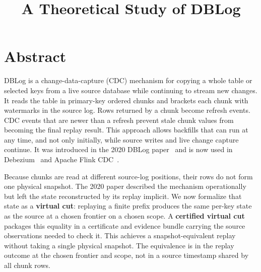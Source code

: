 \documentclass[letterpaper,10pt,twocolumn]{article}
\title{A Theoretical Study of DBLog}
\author{}
\date{}
\makeatletter
\newcommand{\papersubtitle}{Certified Virtual Cuts for a Snapshot-Equivalent Replay of Live Databases}
\newcommand{\paperauthor}{Andreas Andreakis}
\renewcommand{\maketitle}{%
  \twocolumn[{%
    \begin{center}
      {\LARGE\bfseries \@title\par}
      \vspace{0.35em}
      {\large \itshape \papersubtitle\par}
      \vspace{1.1em}
      {\large \paperauthor\par}
    \end{center}
    \vspace{1.5em}
  }]%
  \thispagestyle{plain}%
}
\makeatother
\begin{document}
\maketitle

%
%
\section*{Abstract}\label{abstract}

DBLog is a change-data-capture (CDC) mechanism for copying a whole table
or selected keys from a live source database while continuing to stream
new changes. It reads the table in primary-key ordered chunks and brackets
each chunk with watermarks in the source log. Rows returned by
a chunk become refresh events. CDC events that are newer than a refresh
prevent stale chunk values from becoming the final replay result. This
approach allows backfills that can run at any time, and not only
initially, while source writes and live change capture continue. It was
introduced in the 2020 DBLog
paper~\citep{andreakis2020dblog} and is now used in
Debezium~\citep{debezium_incremental_snapshot} and Apache Flink
CDC~\citep{flink_cdc_incremental_snapshot}.

Because chunks are read at different source-log positions, their rows
do not form one physical snapshot. The 2020 paper described the mechanism
operationally but left the state reconstructed by its replay implicit.
We now formalize that state as a \textbf{virtual cut}: replaying
a finite prefix produces the same per-key state as the source at a chosen
frontier on a chosen scope. A \textbf{certified virtual cut} packages this
equality in a certificate and evidence bundle carrying the source
observations needed to check it. This achieves a snapshot-equivalent
replay without taking a single physical snapshot. The equivalence is in
the replay outcome at the chosen frontier and scope, not in a source
timestamp shared by all chunk rows.
\end{document}
